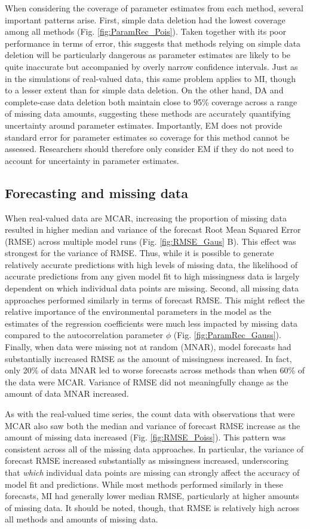 \documentclass{article}
\begin{document}
When considering the coverage of parameter estimates from each method, several important patterns arise. First, simple data deletion had the lowest coverage among all methods (Fig. \ref{fig:ParamRec_Pois}). Taken together with its poor performance in terms of error, this suggests that methods relying on simple data deletion will be particularly dangerous as parameter estimates are likely to be quite inaccurate but accompanied by overly narrow confidence intervals. Just as in the simulations of real-valued data, this same problem applies to MI, though to a lesser extent than for simple data deletion. On the other hand, DA and complete-case data deletion both maintain close to 95\% coverage across a range of missing data amounts, suggesting these methods are accurately quantifying uncertainty around parameter estimates. Importantly, EM does not provide standard error for parameter estimates so coverage for this method cannot be assessed. Researchers should therefore only consider EM if they do not need to account for uncertainty in parameter estimates.


\subsection*{Forecasting and missing data}
When real-valued data are MCAR, increasing the proportion of missing data resulted in higher median and variance of the forecast Root Mean Squared Error (RMSE) across multiple model runs (Fig. \ref{fig:RMSE_Gaus} B). This effect was strongest for the variance of RMSE. Thus, while it is possible to generate relatively accurate predictions with high levels of missing data, the likelihood of accurate predictions from any given model fit to high missingness data is largely dependent on which individual data points are missing. Second, all missing data approaches performed similarly in terms of forecast RMSE. This might reflect the relative importance of the environmental parameters in the model as the estimates of the regression coefficients were much less impacted by missing data compared to the autocorrelation parameter $\phi$ (Fig. \ref{fig:ParamRec_Gauss}). Finally, when data were missing not at random (MNAR), model forecasts had substantially increased RMSE as the amount of missingness increased. In fact, only 20\% of data MNAR led to worse forecasts across methods than when 60\% of the data were MCAR. Variance of RMSE did not meaningfully change as the amount of data MNAR increased. 

As with the real-valued time series, the count data with observations that were MCAR also saw both the median and variance of forecast RMSE increase as the amount of missing data increased (Fig. \ref{fig:RMSE_Poiss}). This pattern was consistent across all of the missing data approaches. In particular, the variance of forecast RMSE increased substantially as missingness increased, underscoring that \textit{which} individual data points are missing can strongly affect the accuracy of model fit and predictions. While most methods performed similarly in these forecasts, MI had generally lower median RMSE, particularly at higher amounts of missing data. It should be noted, though, that RMSE is relatively high across all methods and amounts of missing data. 
\end{document}
